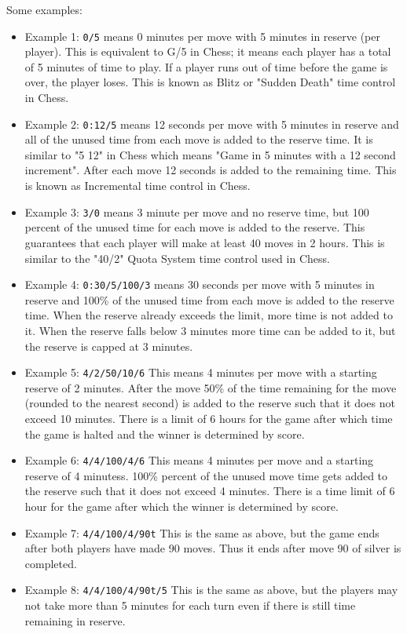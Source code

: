 \documentclass[10pt,dvipdfmx]{report}
\begin{document}
Some examples:
\begin{itemize}
\item Example 1: {\tt 0/5} means 0 minutes per move with 5 minutes
  in reserve (per player). This is equivalent to G/5 in Chess; it
  means each player has a total of 5 minutes of time
  to play.  If a player runs out of time before the
  game is over, the player loses.  This is known as
  Blitz or "Sudden Death" time control in Chess.

\item Example 2: {\tt 0:12/5} means 12 seconds per move
  with 5 minutes in reserve and all of the unused time from
  each move is added to the reserve time.  It is similar 
  to "5 12" in Chess which means "Game in 5 minutes with 
  a 12 second increment".  After each move 12 seconds is 
  added to the remaining time. This is known as Incremental 
  time control in Chess.

\item Example 3: {\tt 3/0} means 3 minute per
  move and no reserve time, but 100 percent of the
  unused time for each move is added to the reserve.  This
  guarantees that each player will make at least 40 moves 
  in 2 hours.  This is similar 
  to the "40/2" Quota System time control used in Chess.
  
\item Example 4: {\tt 0:30/5/100/3} means 30 seconds per move
  with 5 minutes in reserve and 100\% of the unused time from
  each move is added to the reserve time.  When the reserve 
  already exceeds the limit, more time is not added to it.  
  When the reserve falls below 3 minutes more time can be 
  added to it, but the reserve is capped at 3 minutes.
\item   Example 5: {\tt 4/2/50/10/6}
    This means 4 minutes per move with a starting reserve
    of 2 minutes.  After the move 50\% of the time remaining
    for the move (rounded to the nearest second) is added 
    to the reserve such that it does not exceed 10 minutes.  
    There is a limit of 6 hours for the game after which time 
    the game is halted and the winner is determined by score.  
\item   Example 6: {\tt 4/4/100/4/6}
    This means 4 minutes per move and a starting
    reserve of 4 minutess. 100\% percent of the unused move
    time gets added to the reserve such that it does not exceed 
    4 minutes.  There is a time limit of 6 hour for the game
    after which the winner is determined by score.
\item   Example 7: {\tt 4/4/100/4/90t}
    This is the same as above, but the game ends after both
    players have made 90 moves. Thus it ends after move 90
    of silver is completed.
\item   Example 8: {\tt 4/4/100/4/90t/5}
    This is the same as above, but the players may not take
    more than 5 minutes for each turn even if there is 
    still time remaining in reserve.
\end{itemize}
\end{document}
